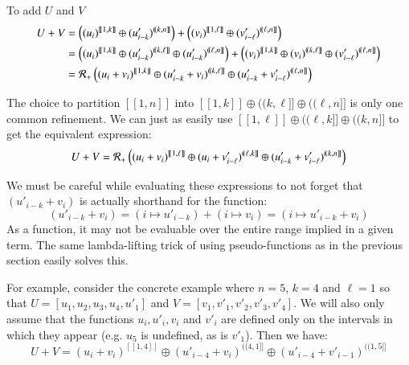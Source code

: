 To add $U$ and $V$
\begin{align}
	U + V
	&= \left( (u_i)^{[\![1, k]\!]} \oplus (u'_{i-k})^{(\!(k,n]\!]} \right) 
		+
		\left( (v_i)^{[\![1, \ell]\!]} \oplus (v'_{i-\ell})^{(\!(\ell,n]\!]} \right) \\
	&= \left( (u_i)^{[\![1, k]\!]} \oplus (u'_{i-k})^{(\!(k,\ell]\!]} \oplus (u'_{i-k})^{(\!(\ell,n]\!]} \right) 
		+
		\left( (v_i)^{[\![1, k]\!]} \oplus (v_i)^{(\!(k, \ell]\!]} \oplus (v'_{i-\ell})^{(\!(\ell,n]\!]} \right) \\
	&= \R[+] \left( (u_i + v_i)^{[\![1, k]\!]} 
		\oplus (u'_{i-k} + v_i)^{(\!(k,\ell]\!]} 
		\oplus (u'_{i-k}+v'_{i-\ell})^{(\!(\ell,n]\!]} \right)
\end{align}


The choice to partition $[\![1,n]\!]$ into $[\![1,k]\!] \oplus (\!(k,\ell]\!] \oplus (\!(\ell, n]\!]$ is only one common refinement.
We can just as easily use $[\![1,\ell]\!] \oplus (\!(\ell, k]\!] \oplus (\!(k, n]\!]$ to get the equivalent expression:
\begin{equation}
	U + V = \R[+] \left( (u_i + v_i)^{[\![1, \ell]\!]} 
		\oplus (u_{i} + v'_{i-\ell})^{(\!(\ell,k]\!]} 
		\oplus (u'_{i-k}+v'_{i-\ell})^{(\!(k,n]\!]} \right)
\end{equation}


We must be careful while evaluating these expressions to not forget that $(u'_{i-k} + v_i)$ 
is actually shorthand for the function:
\begin{equation*}
	(u'_{i-k} + v_i) = (i \mapsto u'_{i-k}) + (i \mapsto v_i) = (i \mapsto u'_{i-k} + v_i)
\end{equation*}
As a function, it may not be evaluable over the entire range implied in a given term.
The same lambda-lifting trick of using pseudo-functions as in the previous section easily solves this.


For example, consider the concrete example where $n=5$, $k=4$ and $\ell = 1$ so that
$U = [ u_1, u_2, u_3, u_4, u'_1 ]$ and
$V = [ v_1, v'_1, v'_2, v'_3, v'_4 ]$.
We will also only assume that the functions $u_i, u'_i, v_i$ and $v'_i$ are defined only on the intervals in which they 
appear (e.g. $u_5$ is undefined, as is $v'_1$).
Then we have:
\begin{equation*}
	U + V = (u_i + v_i)^{[\![1,4]\!]} \oplus (u'_{i-4} + v_i)^{(\!(4,1]\!]} \oplus (u'_{i-4} + v'_{i-1})^{(\!(1,5]\!]}
\end{equation*}

